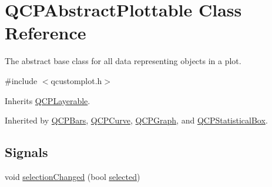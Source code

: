 \hypertarget{class_q_c_p_abstract_plottable}{\section{Q\-C\-P\-Abstract\-Plottable Class Reference}
\label{class_q_c_p_abstract_plottable}
}


The abstract base class for all data representing objects in a plot.  




{\ttfamily \#include $<$qcustomplot.\-h$>$}



Inherits \hyperlink{class_q_c_p_layerable}{Q\-C\-P\-Layerable}.



Inherited by \hyperlink{class_q_c_p_bars}{Q\-C\-P\-Bars}, \hyperlink{class_q_c_p_curve}{Q\-C\-P\-Curve}, \hyperlink{class_q_c_p_graph}{Q\-C\-P\-Graph}, and \hyperlink{class_q_c_p_statistical_box}{Q\-C\-P\-Statistical\-Box}.

\subsection*{Signals}
\begin{DoxyCompactItemize}
\item 
void \hyperlink{class_q_c_p_abstract_plottable_a3af66432b1dca93b28e00e78a8c7c1d9}{selection\-Changed} (bool \hyperlink{class_q_c_p_abstract_plottable_ab901903adcb0e29467d63de72340ab29}{selected})
\end{DoxyCompactItemize}
